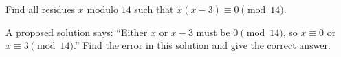 Find all residues $x$ modulo $14$ such that $x(x-3)\equiv0\pmod{14}$.

A proposed solution says: ``Either $x$ or $x-3$ must be $0\pmod{14}$, so $x\equiv0$ or $x\equiv3\pmod{14}$.'' Find the error in this solution and give the correct answer.
